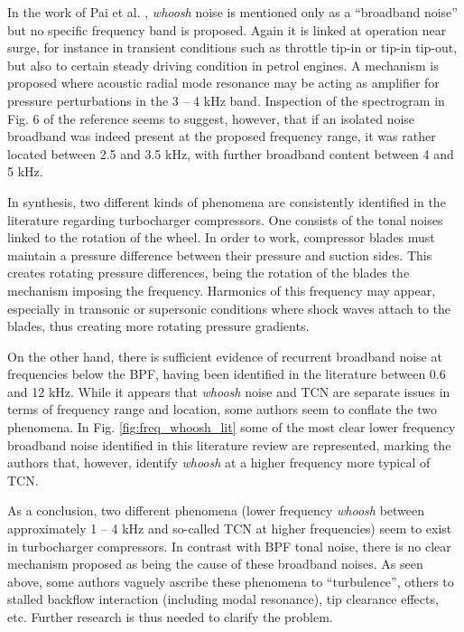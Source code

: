In the work of Pai et al. \cite{pai2015turbocharger}, \emph{whoosh} noise is mentioned only as a ``broadband noise'' but no specific frequency band is proposed. Again it is linked at operation near surge, for instance in transient conditions such as throttle tip-in or tip-in tip-out, but also to certain steady driving condition in petrol engines. A mechanism is proposed where acoustic radial mode resonance may be acting as amplifier for pressure perturbations in the 3 -- 4 kHz band. Inspection of the spectrogram in Fig. 6 of the reference seems to suggest, however, that if an isolated noise broadband was indeed present at the proposed frequency range, it was rather located between 2.5 and 3.5 kHz, with further broadband content between 4 and 5 kHz.

In synthesis, two different kinds of phenomena are consistently identified in the literature regarding turbocharger compressors. One consists of the tonal noises linked to the rotation of the wheel. In order to work, compressor blades must maintain a pressure difference between their pressure and suction sides. This creates rotating pressure differences, being the rotation of the blades the mechanism imposing the frequency. Harmonics of this frequency may appear, especially in transonic or supersonic conditions where shock waves attach to the blades, thus creating more rotating pressure gradients.

On the other hand, there is sufficient evidence of recurrent broadband noise at frequencies below the BPF, having been identified in the literature between 0.6 and 12 kHz. While it appears that  \emph{whoosh} noise and TCN are separate issues in terms of frequency range and location, some authors seem to conflate the two phenomena. In Fig. \ref{fig:freq_whoosh_lit} some of the most clear lower  frequency broadband noise identified in this literature review are represented, marking the authors that, however, identify \emph{whoosh} at a higher frequency more typical of TCN.

As a conclusion, two different phenomena (lower frequency \emph{whoosh} between approximately 1 -- 4 kHz and so-called TCN at higher frequencies) seem to exist in turbocharger compressors. In contrast with BPF tonal noise, there is no clear mechanism proposed as being the cause of these broadband noises. As seen above, some authors vaguely ascribe these phenomena to ``turbulence'', others to stalled backflow interaction (including modal resonance), tip clearance effects, etc. Further research is thus needed to clarify the problem.


